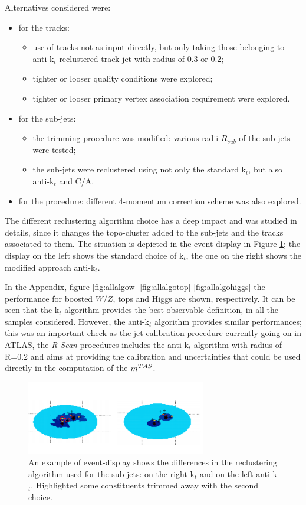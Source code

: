 Alternatives considered were: 
\begin{itemize}
 \item for the tracks:
 \begin{itemize}
   \item use of tracks not as input directly, but only taking those belonging to anti-k$_t$ reclustered track-jet with radius of 0.3 or 0.2;
   \item tighter or looser quality conditions were explored;
   \item tighter or looser primary vertex association requirement were explored.
 \end{itemize}
 \item for the sub-jets:
  \begin{itemize}
   \item the trimming procedure was modified: various radii $R_{sub}$ of the sub-jets were tested;
   \item the sub-jets were reclustered using not only the standard k$_t$, but also anti-k$_t$ and C/A.
  \end{itemize}
  \item for the procedure: different 4-momentum correction scheme was also explored.
\end{itemize}

The different reclustering algorithm choice has a deep impact and was studied in details, since it changes the topo-cluster added to the sub-jets and the tracks associated to them. The situation is depicted in the event-display in Figure \ref{fig:evtdspl}; the display on the left shows the standard choice of k$_t$, the one on the right shows the modified approach anti-k$_t$. 

In the Appendix, figure \ref{fig:allalgow} \ref{fig:allalgotop} \ref{fig:allalgohiggs} the performance for boosted $W/Z$, tops and Higgs are shown, respectively. It can be seen that the k$_t$ algorithm provides the best observable definition, in all the samples considered. However, the anti-k$_t$ algorithm provides similar performances; this was an important check as the jet calibration procedure currently going on in ATLAS, the \textit{R-Scan} procedures includes the anti-k$_t$ algorithm with radius of R=0.2 and aims at providing the calibration and uncertainties that could be used directly in the computation of the $m^{TAS}$.

\begin{figure}[!ht]
  \centering
      \includegraphics[width=0.7\textwidth]{jet_part/mtas/evtdspl.png}
  \caption[Different reclustering in event display]{An example of event-display shows the differences in the reclustering algorithm used for the sub-jets: on the right  k$_t$ and on the left anti-k$_t$. Highlighted some constituents trimmed away with the second choice.}
  \label{fig:evtdspl}
\end{figure}

